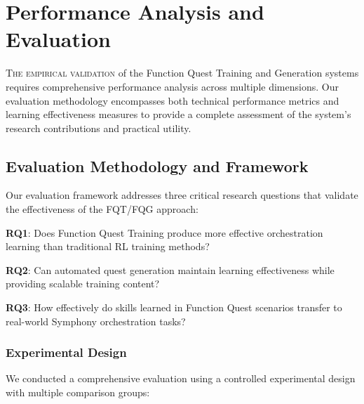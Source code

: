 
\section*{Performance Analysis and Evaluation}

\lettrine{T}{he empirical validation} of the Function Quest Training and Generation systems requires comprehensive performance analysis across multiple dimensions. Our evaluation methodology encompasses both technical performance metrics and learning effectiveness measures to provide a complete assessment of the system's research contributions and practical utility.

\subsection*{Evaluation Methodology and Framework}

Our evaluation framework addresses three critical research questions that validate the effectiveness of the FQT/FQG approach:

\begin{expandedlist}
    \item \textbf{RQ1}: Does Function Quest Training produce more effective orchestration learning than traditional RL training methods?
    \item \textbf{RQ2}: Can automated quest generation maintain learning effectiveness while providing scalable training content?
    \item \textbf{RQ3}: How effectively do skills learned in Function Quest scenarios transfer to real-world Symphony orchestration tasks?
\end{expandedlist}

\subsubsection*{Experimental Design}

We conducted a comprehensive evaluation using a controlled experimental design with multiple comparison groups:

